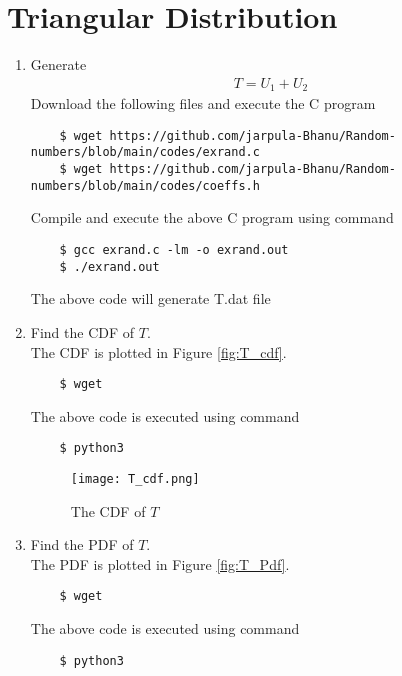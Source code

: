 \documentclass[journal,12pt,twocolumn]{IEEEtran}
\renewcommand\thesection{\arabic{section}}
\begin{document}
\section{Triangular Distribution}
\begin{enumerate}[label=\thesection.\arabic*
,ref=\thesection.\theenumi]
%
\item Generate 
	\begin{align}
		T = U_1+U_2
	\end{align}
    \solution
    Download the following files and execute the C program
    \begin{lstlisting}
    $ wget https://github.com/jarpula-Bhanu/Random-numbers/blob/main/codes/exrand.c
    $ wget https://github.com/jarpula-Bhanu/Random-numbers/blob/main/codes/coeffs.h
    \end{lstlisting}
    Compile and execute the above C program using command
    \begin{lstlisting}
    $ gcc exrand.c -lm -o exrand.out
    $ ./exrand.out
    \end{lstlisting}
The above code will generate T.dat file\\
\item Find the CDF of $T$.\\
\solution The CDF is plotted in Figure \eqref{fig:T_cdf}.

\begin{lstlisting}
    $ wget 
\end{lstlisting}
The above code is executed using command
\begin{lstlisting}
    $ python3 
\end{lstlisting}

\begin{figure}[h]
    \centering
    \texttt{[image: T\_cdf.png]}
    \caption{The CDF of $T$}
    \label{fig:T_cdf}
\end{figure}
\item Find the PDF of $T$.\\
\solution The PDF is plotted in Figure \eqref{fig:T_Pdf}.

\begin{lstlisting}
    $ wget 
\end{lstlisting}
The above code is executed using command
\begin{lstlisting}
    $ python3 
\end{lstlisting}


\end{enumerate}
\end{document}
